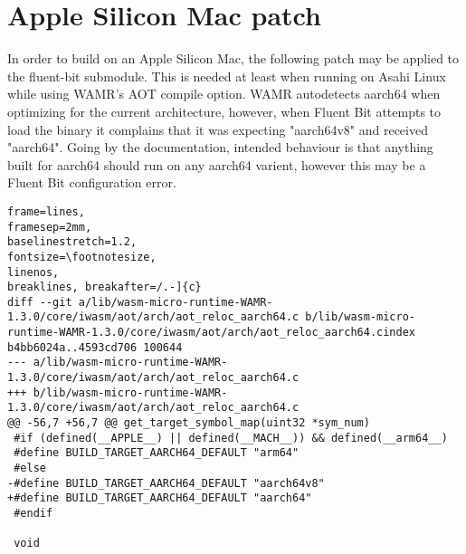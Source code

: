 \section{Apple Silicon Mac patch}
In order to build on an Apple Silicon Mac, the following patch may be applied to the fluent-bit submodule. This is needed at least when running on Asahi Linux while using WAMR's AOT compile option. WAMR autodetects aarch64 when optimizing for the current architecture, however, when Fluent Bit attempts to load the binary it complains that it was expecting "aarch64v8" and received "aarch64". Going by the documentation, intended behaviour is that anything built for aarch64 should run on any aarch64 varient, however this may be a Fluent Bit configuration error.
\begin{lstlisting}[caption={Apple Silicon patch}]
frame=lines,
framesep=2mm,
baselinestretch=1.2,
fontsize=\footnotesize,
linenos,
breaklines, breakafter=/.-]{c}
diff --git a/lib/wasm-micro-runtime-WAMR-1.3.0/core/iwasm/aot/arch/aot_reloc_aarch64.c b/lib/wasm-micro-runtime-WAMR-1.3.0/core/iwasm/aot/arch/aot_reloc_aarch64.cindex b4bb6024a..4593cd706 100644
--- a/lib/wasm-micro-runtime-WAMR-1.3.0/core/iwasm/aot/arch/aot_reloc_aarch64.c
+++ b/lib/wasm-micro-runtime-WAMR-1.3.0/core/iwasm/aot/arch/aot_reloc_aarch64.c
@@ -56,7 +56,7 @@ get_target_symbol_map(uint32 *sym_num)
 #if (defined(__APPLE__) || defined(__MACH__)) && defined(__arm64__)
 #define BUILD_TARGET_AARCH64_DEFAULT "arm64"
 #else
-#define BUILD_TARGET_AARCH64_DEFAULT "aarch64v8"
+#define BUILD_TARGET_AARCH64_DEFAULT "aarch64"
 #endif
 
 void
\end{lstlisting}
